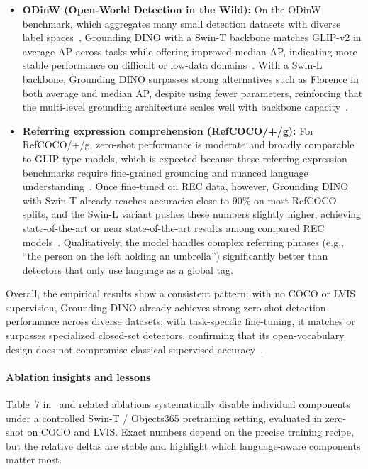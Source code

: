 \begin{enrichment}
\begin{enrichment}
\begin{itemize}
			\item \textbf{ODinW (Open-World Detection in the Wild):} On the ODinW benchmark, which aggregates many small detection datasets with diverse label spaces~\cite{gupta2022_odinw}, Grounding DINO with a Swin-T backbone matches GLIP-v2 in average AP across tasks while offering improved median AP, indicating more stable performance on difficult or low-data domains~\cite{zhang2022_glipv2,liu2023_groundingdino}. With a Swin-L backbone, Grounding DINO surpasses strong alternatives such as Florence in both average and median AP, despite using fewer parameters, reinforcing that the multi-level grounding architecture scales well with backbone capacity~\cite{yuan2021_florence,liu2023_groundingdino}.
			
			\item \textbf{Referring expression comprehension (RefCOCO/+/g):} For RefCOCO/+/g, zero-shot performance is moderate and broadly comparable to GLIP-type models, which is expected because these referring-expression benchmarks require fine-grained grounding and nuanced language understanding~\cite{liu2023_groundingdino}. Once fine-tuned on REC data, however, Grounding DINO with Swin-T already reaches accuracies close to 90\% on most RefCOCO splits, and the Swin-L variant pushes these numbers slightly higher, achieving state-of-the-art or near state-of-the-art results among compared REC models~\cite{liu2023_groundingdino}. Qualitatively, the model handles complex referring phrases (e.g., ``the person on the left holding an umbrella'') significantly better than detectors that only use language as a global tag.
		\end{itemize}
		
		Overall, the empirical results show a consistent pattern: with no COCO or LVIS supervision, Grounding DINO already achieves strong zero-shot detection performance across diverse datasets; with task-specific fine-tuning, it matches or surpasses specialized closed-set detectors, confirming that its open-vocabulary design does not compromise classical supervised accuracy~\cite{liu2023_groundingdino}.
		
		\paragraph{Ablation insights and lessons}
		
		Table~7 in~\cite{liu2023_groundingdino} and related ablations systematically disable individual components under a controlled Swin-T / Objects365 pretraining setting, evaluated in zero-shot on COCO and LVIS. Exact numbers depend on the precise training recipe, but the relative deltas are stable and highlight which language-aware components matter most.
		

\end{enrichment}
\end{enrichment}
